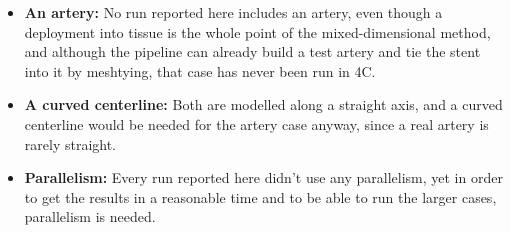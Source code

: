 \begin{itemize}[nosep,leftmargin=*]
  \item \textbf{An artery:} No run reported here includes an artery, even though a deployment into tissue is the whole point of the mixed-dimensional method, and although the pipeline can already build a test artery and tie the stent into it by meshtying, that case has never been run in 4C.
  \item \textbf{A curved centerline:} Both are modelled along a straight axis, and a curved centerline would be needed for the artery case anyway, since a real artery is rarely straight. 
  \item \textbf{Parallelism:} Every run reported here didn't use any parallelism, yet in order to get the results in a reasonable time and to be able to run the larger cases, parallelism is needed. 
\end{itemize}



